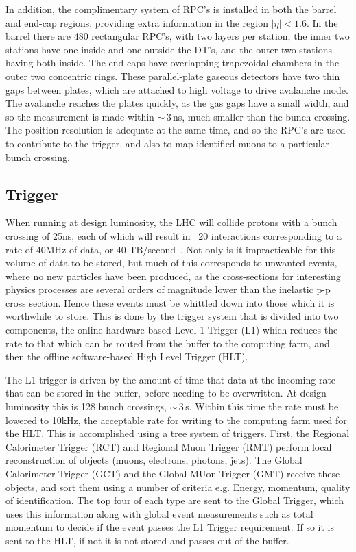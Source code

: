 In addition, the complimentary system of RPC's is installed in both the barrel and end-cap regions, providing extra information in the region $|\eta| < 1.6$. In the barrel there are 480 rectangular RPC's, with two layers per station, the inner two stations have one inside and one outside the DT's, and the outer two stations having both inside. The end-caps have overlapping trapezoidal chambers in the outer two concentric rings. These parallel-plate gaseous detectors have two thin gaps between plates, which are attached to high voltage to drive avalanche mode. The avalanche reaches the plates quickly, as the gas gaps have a small width, and so the measurement is made within $\sim$\,3\,ns, much smaller than the bunch crossing. The position resolution is adequate at the same time, and so the RPC's are used to contribute to the trigger, and also to map identified muons to a particular bunch crossing.

\subsection{Trigger}
\label{sec:detrig}
When running at design luminosity, the LHC will collide protons with a bunch crossing of 25ns, each of which will result in ~20 interactions corresponding to a rate of 40MHz of data, or 40 TB/second~\cite{TRIGTDR}. Not only is it impracticable for this volume of data to be stored, but much of this corresponds to unwanted events, where no new particles have been produced, as the cross-sections for interesting physics processes are several orders of magnitude lower than the inelastic p-p cross section. Hence these events must be whittled down into those which it is worthwhile to store. This is done by the trigger system that is divided into two components, the online hardware-based Level 1 Trigger (L1) which reduces the rate to that which can be routed from the buffer to the computing farm, and then the offline software-based High Level Trigger (HLT). 

The L1 trigger is driven by the amount of time that data at the incoming rate that can be stored in the buffer, before needing to be overwritten. At design luminosity this is 128 bunch crossings, $\sim$\,3\,\textmu s. Within this time the rate must be lowered to 10kHz, the acceptable rate for writing to the computing farm used for the HLT. This is accomplished using a tree system of triggers. First, the Regional Calorimeter Trigger (RCT) and Regional Muon Trigger (RMT) perform local reconstruction of objects (muons, electrons, photons, jets). The Global Calorimeter Trigger (GCT) and the Global MUon Trigger (GMT) receive these objects, and sort them using a number of criteria e.g. Energy, momentum, quality of identification. The top four of each type are sent to the Global Trigger, which uses this information along with global event measurements such as total momentum to decide if the event passes the L1 Trigger requirement. If so it is sent to the HLT, if not it is not stored and passes out of the buffer. 

